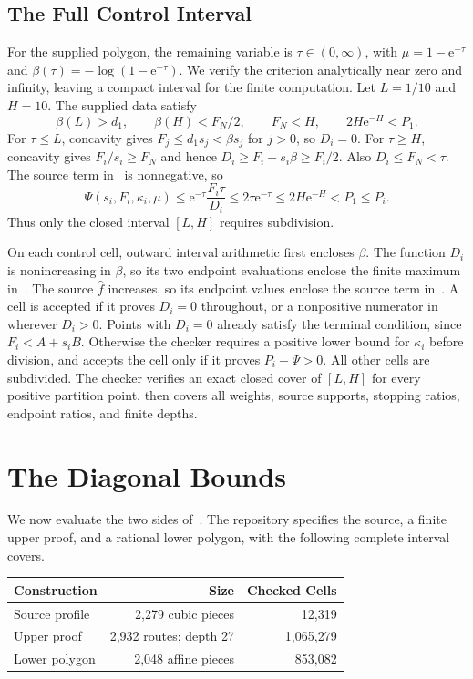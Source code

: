 \documentclass[11pt]{article}
\theoremstyle{definition}
\newcommand{\e}{\mathrm e}
\begin{document}
\subsection{The Full Control Interval}
For the supplied polygon, the remaining variable is $\tau\in(0,\infty)$, with
$\mu=1-\e^{-\tau}$ and $\beta(\tau)=-\log(1-\e^{-\tau})$.
We verify the criterion analytically near zero and infinity, leaving a compact interval for the finite computation.
Let $L=1/10$ and $H=10$.
The supplied data satisfy
\begin{equation}\label{eq:tails}
 \beta(L)>d_1,\qquad
 \beta(H)<F_N/2,\qquad F_N<H,\qquad
 2H\e^{-H}<P_1.
\end{equation}
For $\tau\le L$, concavity gives $F_j\le d_1s_j<\beta s_j$ for $j>0$, so $D_i=0$.
For $\tau\ge H$, concavity gives $F_i/s_i\ge F_N$ and hence
$D_i\ge F_i-s_i\beta\ge F_i/2$.
Also $D_i\le F_N<\tau$.
The source term in~ is nonnegative, so
\[
 \Psi(s_i,F_i,\kappa_i,\mu)
 \le\e^{-\tau}\frac{F_i\tau}{D_i}
 \le2\tau\e^{-\tau}\le2H\e^{-H}<P_1\le P_i.
\]
Thus only the closed interval $[L,H]$ requires subdivision.

On each control cell, outward interval arithmetic first encloses $\beta$.
The function $D_i$ is nonincreasing in $\beta$, so its two endpoint evaluations enclose the finite maximum in~.
The source $\widehat f$ increases, so its endpoint values enclose the source term in~.
A cell is accepted if it proves $D_i=0$ throughout, or a nonpositive numerator in~ wherever $D_i>0$.
Points with $D_i=0$ already satisfy the terminal condition, since $F_i<A+s_iB$.
Otherwise the checker requires a positive lower bound for $\kappa_i$ before division, and accepts the cell only if it proves $P_i-\Psi>0$.
All other cells are subdivided.
The checker verifies an exact closed cover of $[L,H]$ for every positive partition point.
 then covers all weights, source supports, stopping ratios, endpoint ratios, and finite depths.


\section{The Diagonal Bounds}\label{sec:certificate}
We now evaluate the two sides of~.
The repository specifies the source, a finite upper proof, and a rational lower polygon, with the following complete interval covers.
\begin{center}
\begin{tabular}{lrr}
\toprule
Construction & Size & Checked Cells\\
\midrule
Source profile & 2,279 cubic pieces & 12,319\\
Upper proof & 2,932 routes; depth 27 & 1,065,279\\
Lower polygon & 2,048 affine pieces & 853,082\\
\bottomrule
\end{tabular}
\end{center}
\end{document}
